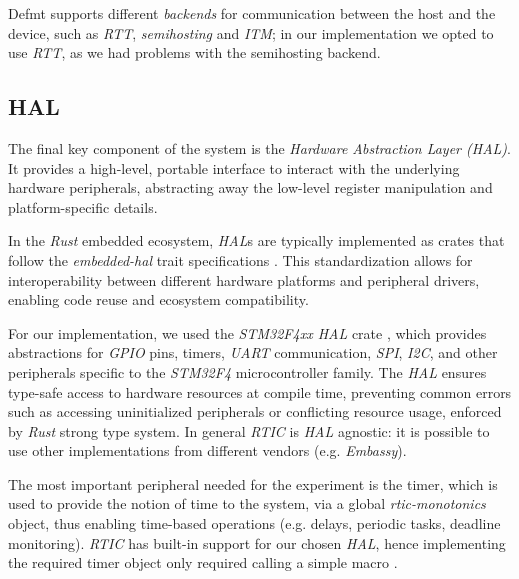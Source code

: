 Defmt supports different \textit{backends} for communication between the host
and the device, such as \textit{RTT}, \textit{semihosting} and \textit{ITM}; in
our implementation we opted to use \textit{RTT}, as we had problems with the
semihosting backend. 

\subsection{HAL}

The final key component of the system is the \textit{Hardware Abstraction Layer
(HAL)}. It provides a high-level, portable interface to interact with the
underlying hardware peripherals, abstracting away the low-level register
manipulation and platform-specific details. 

In the \textit{Rust} embedded ecosystem, \textit{HAL}s are typically implemented
as crates that follow the \textit{embedded-hal} trait specifications
\cite{RustembeddedEmbeddedhal2025}. This standardization allows for
interoperability between different hardware platforms and peripheral drivers,
enabling code reuse and ecosystem compatibility. 

For our implementation, we used the \textit{STM32F4xx HAL} crate
\cite{Stm32rsStm32f4xxhal2025}, which provides abstractions for \textit{GPIO}
pins, timers, \textit{UART} communication, \textit{SPI}, \textit{I2C}, and other
peripherals specific to the \textit{STM32F4} microcontroller family. The
\textit{HAL} ensures type-safe access to hardware resources at compile time,
preventing common errors such as accessing uninitialized peripherals or
conflicting resource usage, enforced by \textit{Rust} strong type system. 
In general \textit{RTIC} is \textit{HAL} agnostic: it is possible to use other
implementations from different vendors (e.g. \textit{Embassy}). 

The most important peripheral needed for the experiment is the timer, which is
used to provide the notion of time to the system, via a global
\textit{rtic-monotonics} object, thus enabling time-based operations (e.g.
delays, periodic tasks, deadline monitoring). \textit{RTIC} has built-in support
for our chosen \textit{HAL}, hence implementing the required timer object only
required calling a simple macro \cite{Rticmonotonics}.  